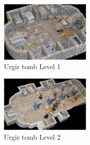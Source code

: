 \begin{figure}[h]
	\centering
	\includegraphics[width=0.4\textwidth]{images/Urgir-tomb-Level-1-594710874_mod.jpg}
	\caption{Urgir tomb Level 1}
	\label{fig:Urgir-tomb-Level-1-594710874}
\end{figure}

\begin{figure}[h]
	\centering
	\includegraphics[width=0.4\textwidth]{images/Urgir-tomb-Level-2-594712324_mod.jpg}
	\caption{Urgir tomb Level 2}
	\label{fig:Urgir-tomb-Level-2-594712324}
\end{figure}

